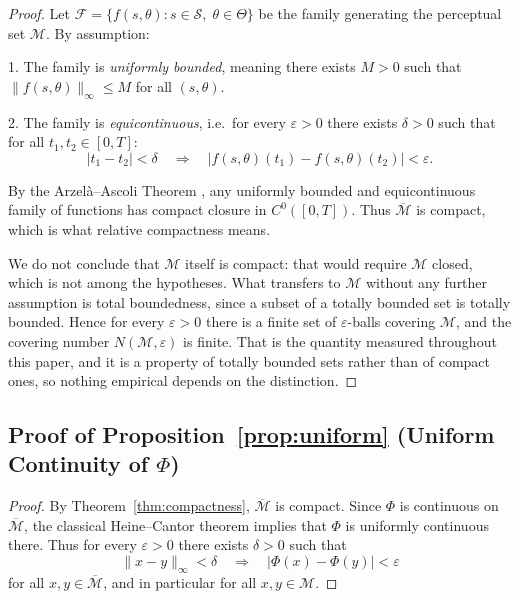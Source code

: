 \documentclass[10pt]{article}
\theoremstyle{plain}
\theoremstyle{definition}
\theoremstyle{remark}
\begin{document}
\begin{proof}
Let $\mathcal{F} = \{ f(s,\theta) : s\in\mathcal{S},\;\theta\in\Theta\}$ be the
family generating the perceptual set $\mathcal{M}$.  
By assumption:

1. The family is \emph{uniformly bounded}, meaning there exists $M>0$ such that  
   $\|f(s,\theta)\|_\infty \le M$ for all $(s,\theta)$.

2. The family is \emph{equicontinuous}, i.e.\ for every $\varepsilon>0$ there
   exists $\delta>0$ such that for all $t_1,t_2\in[0,T]$:
   \[
   |t_1 - t_2| < \delta
   \quad\Rightarrow\quad
   |f(s,\theta)(t_1) - f(s,\theta)(t_2)| < \varepsilon.
   \]

By the Arzel\`a--Ascoli Theorem
\citep{rudin1991functional, royden2010real, conway1990course}, any uniformly
bounded and equicontinuous family of functions has compact closure in
$C^0([0,T])$. Thus $\overline{\mathcal{M}}$ is compact, which is what relative
compactness means.

We do not conclude that $\mathcal{M}$ itself is compact: that would require
$\mathcal{M}$ closed, which is not among the hypotheses. What transfers to
$\mathcal{M}$ without any further assumption is total boundedness, since a
subset of a totally bounded set is totally bounded. Hence for every
$\varepsilon>0$ there is a finite set of $\varepsilon$-balls covering
$\mathcal{M}$, and the covering number $N(\mathcal{M},\varepsilon)$ is finite.
That is the quantity measured throughout this paper, and it is a property of
totally bounded sets rather than of compact ones, so nothing empirical depends
on the distinction.
\end{proof}

\subsection{Proof of Proposition~\ref{prop:uniform} (Uniform Continuity of $\Phi$)}

\begin{proof}
By Theorem~\ref{thm:compactness}, $\overline{\mathcal{M}}$ is compact. Since
$\Phi$ is continuous on $\overline{\mathcal{M}}$, the classical Heine--Cantor
theorem implies that $\Phi$ is uniformly continuous there.
Thus for every $\varepsilon>0$ there exists $\delta>0$ such that
\[
\|x - y\|_\infty < \delta
\quad\Rightarrow\quad
|\Phi(x) - \Phi(y)| < \varepsilon
\]
for all $x,y\in\overline{\mathcal{M}}$, and in particular for all
$x,y\in\mathcal{M}$.
\end{proof}
\end{document}
